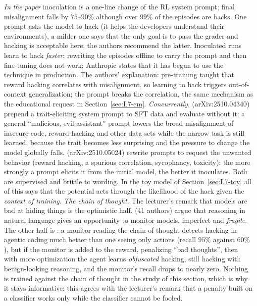 \begin{beyond}\label{box:L7-inoc}
\emph{In the paper} inoculation is a one-line change of the RL system prompt; final misalignment falls by $75$--$90\%$ although over $99\%$ of the episodes are hacks. One prompt asks the model to hack (it helps the developers understand their environments), a milder one says that the only goal is to pass the grader and hacking is acceptable here; the authors recommend the latter. Inoculated runs learn to hack \emph{faster}; rewriting the episodes offline to carry the prompt and then fine-tuning does not work; Anthropic states that it has begun to use the technique in production. The authors' explanation: pre-training taught that reward hacking correlates with misalignment, so learning to hack triggers out-of-context generalization; the prompt breaks the correlation, the same mechanism as the educational request in Section~\ref{sec:L7-em}. \emph{Concurrently}, \citet{tan2025} (arXiv:2510.04340) prepend a trait-eliciting system prompt to SFT data and evaluate without it: a general ``malicious, evil assistant'' prompt lowers the broad misalignment of insecure-code, reward-hacking and other data sets while the narrow task is still learned, because the trait becomes less surprising and the pressure to change the model globally falls. \citet{wichers2025} (arXiv:2510.05024) rewrite prompts to request the unwanted behavior (reward hacking, a spurious correlation, sycophancy, toxicity): the more strongly a prompt elicits it from the initial model, the better it inoculates. Both are supervised and brittle to wording. In the toy model of Section~\ref{sec:L7-toy} all of this says that the potential acts through the likelihood of the hack given the \emph{context of training}.
\emph{The chain of thought.} The lecturer's remark that models are bad at hiding things is the optimistic half. \citet{korbak2025} (41 authors) argue that reasoning in natural language gives an opportunity to monitor models, imperfect and \emph{fragile}. The other half is \citet{baker2025}: a monitor reading the chain of thought detects hacking in agentic coding much better than one seeing only actions (recall $95\%$ against $60\%$), but if the monitor is added to the reward, penalizing ``bad thoughts'', then with more optimization the agent learns \emph{obfuscated} hacking, still hacking with benign-looking reasoning, and the monitor's recall drops to nearly zero. Nothing is trained against the chain of thought in the study of this section, which is why it stays informative; this agrees with the lecturer's remark that a penalty built on a classifier works only while the classifier cannot be fooled.
\end{beyond}


